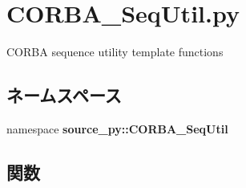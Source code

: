 \section{CORBA\_\-SeqUtil.py}
\label{_c_o_r_b_a___seq_util_8py}
CORBA sequence utility template functions 

\subsection*{ネームスペース}
\begin{CompactItemize}
\item 
namespace \textbf{source\_\-py::CORBA\_\-SeqUtil}
\end{CompactItemize}
\subsection*{関数}
